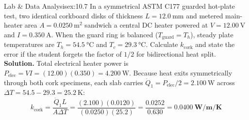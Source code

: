 \begin{workedexample}{Lab \& Data Analysis}{ex:10.7}
In a symmetrical ASTM C177 guarded hot-plate test, two identical corkboard disks of thickness $L = \SI{12.0}{\milli\meter}$ and metered main-heater area $A = \SI{0.0250}{\square\meter}$ sandwich a central DC heater powered at $V = \SI{12.00}{\volt}$ and $I = \SI{0.350}{\ampere}$. When the guard ring is balanced ($T_{\mathrm{guard}} = T_h$), steady plate temperatures are $T_h = \SI{54.5}{\celsius}$ and $T_c = \SI{29.3}{\celsius}$. Calculate $k_{\mathrm{cork}}$ and state the error if the student forgets the factor of $1/2$ for bidirectional heat split.
\tcblower
\textbf{Solution.} Total electrical heater power is $P_{\mathrm{elec}} = V I = (12.00)(0.350) = \SI{4.200}{\watt}$. Because heat exits symmetrically through both cork specimens, each slab carries $\dot{Q}_1 = P_{\mathrm{elec}}/2 = \SI{2.100}{\watt}$ across $\Delta T = 54.5 - 29.3 = \SI{25.2}{\kelvin}$:
\[
  k_{\mathrm{cork}} = \frac{\dot{Q}_1 L}{A \Delta T} = \frac{(2.100)(0.0120)}{(0.0250)(25.2)} = \frac{0.0252}{0.630} = \mathbf{\SI{0.0400}{\watt\per\meter\per\kelvin}}
\]
\end{workedexample}

